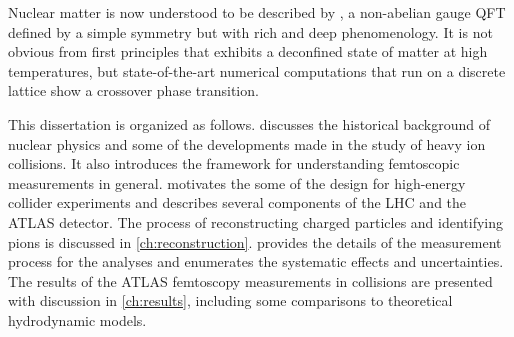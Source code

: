 Nuclear matter is now understood to be described by \qcd, a non-abelian gauge \ac{QFT} defined by a simple symmetry but with rich and deep phenomenology.
It is not obvious from first principles that \qcd exhibits a deconfined state of matter at high temperatures, but state-of-the-art numerical computations that run \qcd on a discrete lattice show a crossover phase transition.



This dissertation is organized as follows.
 discusses the historical background of nuclear physics and some of the developments made in the study of heavy ion collisions.
It also introduces the framework for understanding femtoscopic measurements in general.
 motivates the some of the design for high-energy collider experiments and describes several components of the \ac{LHC} and the ATLAS detector.
The process of reconstructing charged particles and identifying pions is discussed in \cref{ch:reconstruction}.
 provides the details of the measurement process for the analyses and enumerates the systematic effects and uncertainties.
The results of the ATLAS femtoscopy measurements in \pPb collisions are presented with discussion in \cref{ch:results}, including some comparisons to theoretical hydrodynamic models.
